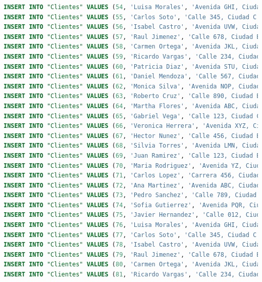 \documentclass[12pt]{article}
\begin{document}
\begin{lstlisting}[language=SQL]
INSERT INTO "Clientes" VALUES (54, 'Luisa Morales', 'Avenida GHI, Ciudad B', '901-234-5678');
INSERT INTO "Clientes" VALUES (55, 'Carlos Soto', 'Calle 345, Ciudad C', '234-567-8901');
INSERT INTO "Clientes" VALUES (56, 'Isabel Castro', 'Avenida UVW, Ciudad A', '567-890-1234');
INSERT INTO "Clientes" VALUES (57, 'Raul Jimenez', 'Calle 678, Ciudad B', '890-123-4567');
INSERT INTO "Clientes" VALUES (58, 'Carmen Ortega', 'Avenida JKL, Ciudad C', '123-456-7890');
INSERT INTO "Clientes" VALUES (59, 'Ricardo Vargas', 'Calle 234, Ciudad A', '456-789-0123');
INSERT INTO "Clientes" VALUES (60, 'Patricia Diaz', 'Avenida STU, Ciudad B', '789-012-3456');
INSERT INTO "Clientes" VALUES (61, 'Daniel Mendoza', 'Calle 567, Ciudad C', '012-345-6789');
INSERT INTO "Clientes" VALUES (62, 'Monica Silva', 'Avenida NOP, Ciudad A', '345-678-9012');
INSERT INTO "Clientes" VALUES (63, 'Roberto Cruz', 'Calle 890, Ciudad B', '678-901-2345');
INSERT INTO "Clientes" VALUES (64, 'Martha Flores', 'Avenida ABC, Ciudad C', '901-234-5678');
INSERT INTO "Clientes" VALUES (65, 'Gabriel Vega', 'Calle 123, Ciudad C', '234-567-8901');
INSERT INTO "Clientes" VALUES (66, 'Veronica Herrera', 'Avenida XYZ, Ciudad A', '567-890-1234');
INSERT INTO "Clientes" VALUES (67, 'Hector Nunez', 'Calle 456, Ciudad B', '890-123-4567');
INSERT INTO "Clientes" VALUES (68, 'Silvia Torres', 'Avenida LMN, Ciudad C', '123-456-7890');
INSERT INTO "Clientes" VALUES (69, 'Juan Ramirez', 'Calle 123, Ciudad B', '123-987-6543');
INSERT INTO "Clientes" VALUES (70, 'Maria Rodriguez', 'Avenida YZ, Ciudad H', '977-654-3210');
INSERT INTO "Clientes" VALUES (71, 'Carlos Lopez', 'Carrera 456, Ciudad C', '456-789-0123');
INSERT INTO "Clientes" VALUES (72, 'Ana Martinez', 'Avenida ABC, Ciudad A', '789-012-3456');
INSERT INTO "Clientes" VALUES (73, 'Pedro Sanchez', 'Calle 789, Ciudad B', '012-345-6789');
INSERT INTO "Clientes" VALUES (74, 'Sofia Gutierrez', 'Avenida PQR, Ciudad C', '345-678-9012');
INSERT INTO "Clientes" VALUES (75, 'Javier Hernandez', 'Calle 012, Ciudad A', '678-901-2345');
INSERT INTO "Clientes" VALUES (76, 'Luisa Morales', 'Avenida GHI, Ciudad B', '901-234-5678');
INSERT INTO "Clientes" VALUES (77, 'Carlos Soto', 'Calle 345, Ciudad C', '234-567-8901');
INSERT INTO "Clientes" VALUES (78, 'Isabel Castro', 'Avenida UVW, Ciudad A', '567-890-1234');
INSERT INTO "Clientes" VALUES (79, 'Raul Jimenez', 'Calle 678, Ciudad B', '890-123-4567');
INSERT INTO "Clientes" VALUES (80, 'Carmen Ortega', 'Avenida JKL, Ciudad C', '123-456-7890');
INSERT INTO "Clientes" VALUES (81, 'Ricardo Vargas', 'Calle 234, Ciudad A', '456-789-0123');

\end{lstlisting}
\end{document}

